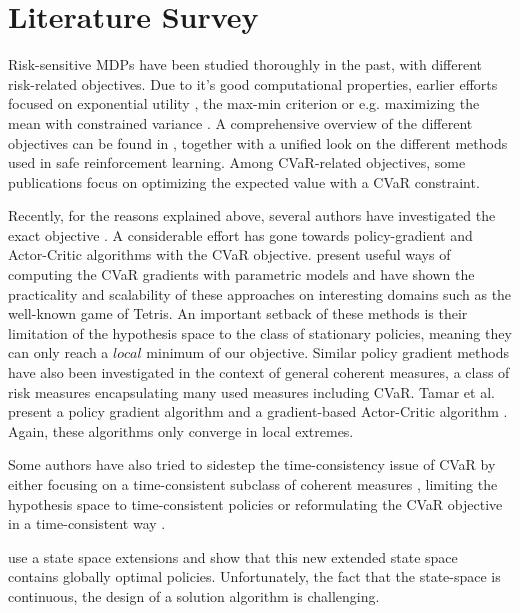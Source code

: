 \section{Literature Survey}\label{sec:prelim:literature}

Risk-sensitive MDPs have been studied thoroughly in the past, with different risk-related objectives. Due to it's good computational properties, earlier efforts focused on exponential utility \citep{howard1972risk}, the max-min criterion \cite{minmax} or e.g. maximizing the mean with constrained variance \citep{sobel1982variance}. A comprehensive overview of the different objectives can be found in \citet{garcia2015comprehensive}, together with a unified look on the different methods used in safe reinforcement learning. Among CVaR-related objectives, some publications focus on optimizing the expected value with a CVaR constraint\citep{borkar2010risk, prashanth2014policy}.

Recently, for the reasons explained above, several authors have investigated the exact objective . A considerable effort has gone towards policy-gradient \citep{sutton2000policy} and Actor-Critic \citep{konda2000actor} algorithms with the CVaR objective. \citep{tamar2015optimizing, chow2014algorithms} present useful ways of computing the CVaR gradients with parametric models and have shown the practicality and scalability of these approaches on interesting domains such as the well-known game of Tetris. An important setback of these methods is their limitation of the hypothesis space to the class of stationary policies, meaning they can only reach a $local$ minimum of our objective.
Similar policy gradient methods have also been investigated in the context of general coherent measures, a class of risk measures encapsulating many used measures including CVaR. Tamar et al. present a policy gradient algorithm \citep{tamar2017sequential} and a gradient-based Actor-Critic algorithm \citep{tamar2017sequential}. Again, these algorithms only converge in local extremes.

Some authors have also tried to sidestep the time-consistency issue of CVaR by either focusing on a time-consistent subclass of coherent measures \cite{???}, limiting the hypothesis space to time-consistent policies or reformulating the CVaR objective in a time-consistent way \cite{miller2017optimal}.

\citet{bauerle2011markov} use a state space extensions and show that this new extended state space contains globally optimal policies. Unfortunately, the fact that the state-space is continuous, the design of a solution algorithm is challenging.

